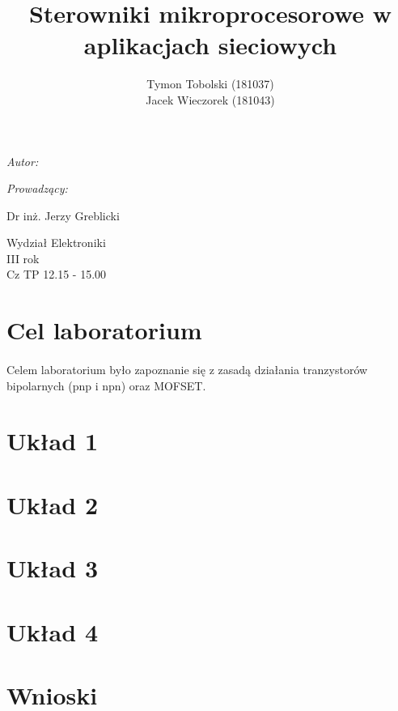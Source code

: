 \documentclass[wide,a4paper,titlepage,12pt] {article}
\title{Sterowniki mikroprocesorowe w aplikacjach sieciowych}
\author{Tymon Tobolski (181037)\\ Jacek Wieczorek (181043)}
\makeatletter
\renewcommand{\maketitle}{
\begin{titlepage}
  \begin{center}
    \vspace*{3cm}
    \LARGE \@title \par
    \vspace{2cm}
    \textit{\small Autor:}\par
    \normalsize \@author\par \normalsize
    \vspace{3cm}
    \textit{\small Prowadzący:}\par
    Dr inż. Jerzy Greblicki \par
    \vspace{2cm}
    Wydział Elektroniki\\ III rok\\ Cz TP 12.15 - 15.00\par

  \end{center}
\end{titlepage}
}
\makeatother
\begin{document}
\maketitle
  \section{Cel laboratorium}
  \paragraph{}
  Celem laboratorium było zapoznanie się z zasadą działania tranzystorów bipolarnych (pnp i npn) oraz MOFSET.

  \section{Układ 1}
  \paragraph{}

  \section{Układ 2}
  \paragraph{}

  \section{Układ 3}
  \paragraph{}

  \section{Układ 4}
  \paragraph{}

  \section{Wnioski}
  \paragraph{}
\end{document}
